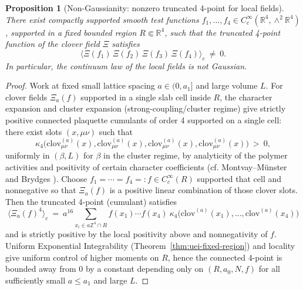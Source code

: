 \documentclass[11pt]{amsart}
\theoremstyle{plain}
\newtheorem{proposition}[theorem]{Proposition}
\theoremstyle{definition}
\theoremstyle{remark}
\begin{document}
\begin{proposition}[Non-Gaussianity: nonzero truncated 4-point for local fields]\label{prop:nonzero-cumulant4}
There exist compactly supported smooth test functions $f_1,\ldots,f_4\in C_c^\infty(\mathbb R^4,\wedge^2\mathbb R^4)$, supported in a fixed bounded region $R\Subset\mathbb R^4$, such that the truncated 4-point function of the clover field $\Xi$ satisfies
\[
  \langle \Xi(f_1)\,\Xi(f_2)\,\Xi(f_3)\,\Xi(f_4)\rangle_c\ \neq\ 0.
\]
In particular, the continuum law of the local fields is not Gaussian.
\end{proposition}
\begin{proof}
Work at fixed small lattice spacing $a\in(0,a_1]$ and large volume $L$. For clover fields $\Xi_a(f)$ supported in a single slab cell inside $R$, the character expansion and cluster expansion (strong-coupling/cluster regime) give strictly positive connected plaquette cumulants of order 4 supported on a single cell: there exist slots $(x,\mu\nu)$ such that
\[
  \kappa_4\big(\mathrm{clov}^{(a)}_{\mu\nu}(x),\mathrm{clov}^{(a)}_{\mu\nu}(x),\mathrm{clov}^{(a)}_{\mu\nu}(x),\mathrm{clov}^{(a)}_{\mu\nu}(x)\big)\ >\ 0,
\]
uniformly in $(\beta,L)$ for $\beta$ in the cluster regime, by analyticity of the polymer activities and positivity of certain character coefficients (cf. Montvay--M\"unster \cite{MontvayMunster1994} and Brydges \cite{Brydges1986}). Choose $f_1=\cdots=f_4=:f\in C_c^\infty(R)$ supported that cell and nonnegative so that $\Xi_a(f)$ is a positive linear combination of those clover slots. Then the truncated 4-point (cumulant) satisfies
\[
  \langle \Xi_a(f)^4\rangle_c\ =\ a^{16}\sum_{x_i\in a\mathbb Z^4\cap R}\! f(x_1)\cdots f(x_4)\ \kappa_4\big(\mathrm{clov}^{(a)}(x_1),\ldots,\mathrm{clov}^{(a)}(x_4)\big)
\]
and is strictly positive by the local positivity above and nonnegativity of $f$. Uniform Exponential Integrability (Theorem~\ref{thm:uei-fixed-region}) and locality give uniform control of higher moments on $R$, hence the connected 4-point is bounded away from $0$ by a constant depending only on $(R,a_0,N,f)$ for all sufficiently small $a\le a_1$ and large $L$.


\end{proof}
\end{document}
